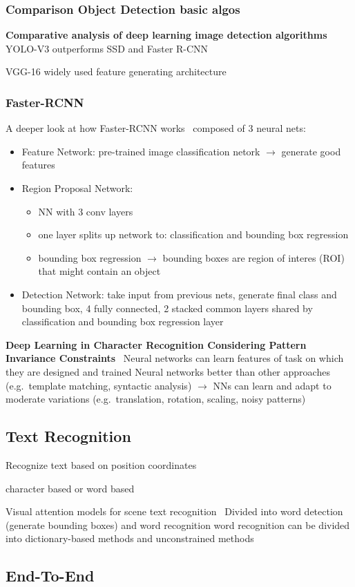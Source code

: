 \subsubsection*{Comparison Object Detection basic algos}
\textbf{Comparative analysis of deep learning image detection
algorithms}~\citep{srivastava_comparative_2021}
YOLO-V3 outperforms SSD and Faster R-CNN

VGG-16 widely used feature generating architecture

\subsubsection*{Faster-RCNN}
A deeper look at how Faster-RCNN works~\citep{goswami_deeper_2018}
composed of 3 neural nets:
\begin{itemize}
    \item Feature Network: pre-trained image classification netork $\rightarrow$ generate good features
    \item Region Proposal Network:
        \begin{itemize}
            \item NN with 3 conv layers
            \item one layer splits up network to: classification and bounding box regression
            \item bounding box regression $\rightarrow$ bounding boxes are region of interes (ROI)
                that might contain an object
        \end{itemize}
    \item Detection Network: take input from previous nets, generate final class and bounding box,
        4 fully connected, 2 stacked common layers shared by classification and bounding box regression
        layer \end{itemize}

\textbf{Deep Learning in Character Recognition Considering Pattern Invariance
Constraints}~\citep{oyedotun_deep_2015}
Neural networks can learn features of task on which they are designed and trained
Neural networks better than other approaches (e.g.\ template matching, syntactic analysis)
$\rightarrow$ NNs can learn and adapt to moderate variations (e.g.\ translation, rotation, scaling,
noisy patterns)

\subsection*{Text Recognition}
Recognize text based on position coordinates

character based or word based

Visual attention models for scene text recognition~\citep{ghosh_visual_2017}
Divided into word detection (generate bounding boxes) and word recognition
word recognition can be divided into dictionary-based methods and unconstrained methods

\subsection*{End-To-End}
